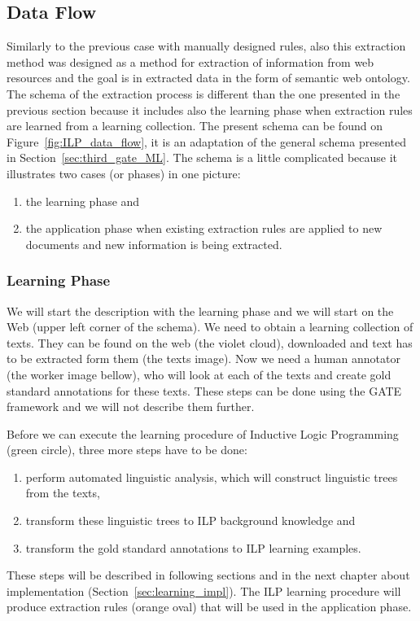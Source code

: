 \subsection{Data Flow}


Similarly to the previous case with manually designed rules, also this extraction method was designed as a method for extraction of information from web resources and the goal is in extracted data in the form of semantic web ontology. The schema of the extraction process is different than the one presented in the previous section because it includes also the learning phase when extraction rules are learned from a learning collection. The present schema can be found on Figure~\ref{fig:ILP_data_flow}, it is an adaptation of the general schema presented in Section~\ref{sec:third_gate_ML}. The schema is a little complicated because it illustrates two cases (or phases) in one picture:
\begin{enumerate}
	\item the learning phase and
	\item the application phase when existing extraction rules are applied to new documents and new information is being extracted.
\end{enumerate}

\subsubsection{Learning Phase}
We will start the description with the learning phase and we will start on the Web (upper left corner of the schema). We need to obtain a learning collection of texts. They can be found on the web (the violet cloud), downloaded and text has to be extracted form them (the texts image). Now we need a human annotator (the worker image bellow), who will look at each of the texts and create gold standard annotations for these texts. These steps can be done using the GATE framework and we will not describe them further. 

Before we can execute the learning procedure of Inductive Logic Programming (green circle), three more steps have to be done:
\begin{enumerate}
	\item perform automated linguistic analysis, which will construct linguistic trees from the texts,
	\item transform these linguistic trees to ILP background knowledge and
	\item transform the gold standard annotations to ILP learning examples.
\end{enumerate}
These steps will be described in following sections and in the next chapter about implementation (Section~\ref{sec:learning_impl}). The ILP learning procedure will produce extraction rules (orange oval) that will be used in the application phase.

